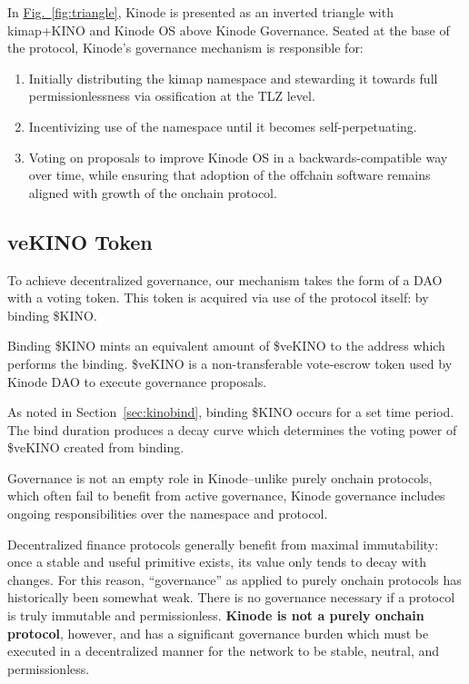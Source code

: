 \documentclass[runningheads]{llncs}
\begin{document}
In \hyperref[fig:triangle]{Fig.~\ref{fig:triangle}}, Kinode is presented as an inverted triangle with kimap+KINO and Kinode OS above Kinode Governance.
Seated at the base of the protocol, Kinode's governance mechanism is responsible for:
\begin{enumerate}
    \item Initially distributing the kimap namespace and stewarding it towards full permissionlessness via ossification at the TLZ level.
    \item Incentivizing use of the namespace until it becomes self-perpetuating.
    \item Voting on proposals to improve Kinode OS in a backwards-compatible way over time, while ensuring that adoption of the offchain software remains aligned with growth of the onchain protocol.
\end{enumerate}

\subsection{veKINO Token}
\label{sec:daovekino}

To achieve decentralized governance, our mechanism takes the form of a DAO with a voting token.
This token is acquired via use of the protocol itself: by binding \$KINO.

Binding \$KINO mints an equivalent amount of \$veKINO to the address which performs the binding.
\$veKINO is a non-transferable vote-escrow token used by Kinode DAO to execute governance proposals.

As noted in Section~\ref{sec:kinobind}, binding \$KINO occurs for a set time period.
The bind duration produces a decay curve which determines the voting power of \$veKINO created from binding.

Governance is not an empty role in Kinode–unlike purely onchain protocols, which often fail to benefit from active governance, Kinode governance includes ongoing responsibilities over the namespace and protocol.

Decentralized finance protocols generally benefit from maximal immutability: once a stable and useful primitive exists, its value only tends to decay with changes.
For this reason, ``governance'' as applied to purely onchain protocols has historically been somewhat weak.
There is no governance necessary if a protocol is truly immutable and permissionless. \textbf{Kinode is not a purely onchain protocol}, however, and has a significant governance burden which must be executed in a decentralized manner for the network to be stable, neutral, and permissionless.
\end{document}
